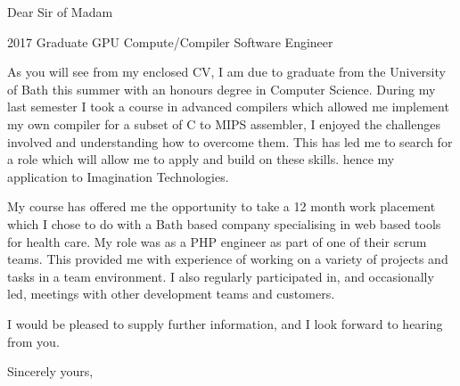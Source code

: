 \documentclass[11pt]{letter} %
\begin{document}

\begin{letter}{}


\signature{Robert Willison} %


\opening{Dear Sir of Madam}

\begin{center}
2017 Graduate GPU Compute/Compiler Software Engineer
\end{center}

As you will see from my enclosed CV, I am due to graduate from the University of Bath
this summer with an honours degree in Computer Science. During my last semester I took
a course in advanced compilers which allowed me implement my own compiler for a subset of
C to MIPS assembler, I enjoyed the challenges involved and understanding how to overcome them.
This has led me to search for a role which will allow me to apply and build on these skills. hence my application to
Imagination Technologies.

My course has offered me the opportunity to take a 12 month work placement which I
chose to do with a Bath based company specialising in web based tools for health care. My
role was as a PHP engineer as part of one of their scrum teams. This provided me with
experience of working on a variety of projects and tasks in a team environment. I also
regularly participated in, and occasionally led, meetings with other development teams and
customers.

I would be pleased to supply further information, and I look forward to hearing from you.

\closing{Sincerely yours,}

\end{letter}
\end{document}

